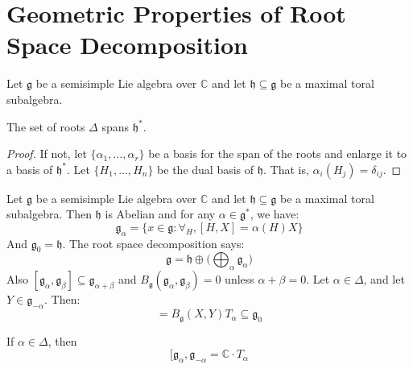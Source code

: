 \documentclass[crop=false,class=article]{standalone}                           %
\begin{document}
    \section{Geometric Properties of Root Space Decomposition}
        Let $\mathfrak{g}$ be a semisimple Lie algebra over $\mathbb{C}$ and let
        $\mathfrak{h}\subseteq\mathfrak{g}$ be a maximal toral subalgebra.
        \begin{theorem}
            The set of roots $\Delta$ spans $\mathfrak{h}^{*}$.
        \end{theorem}
        \begin{proof}
            If not, let $\{\alpha_{1},\dots,\alpha_{r}\}$ be a basis for the
            span of the roots and enlarge it to a basis of $\mathfrak{h}^{*}$.
            Let $\{H_{1},\dots,H_{n}\}$ be the dual basis of $\mathfrak{h}$.
            That is, $\alpha_{i}(H_{j})=\delta_{ij}$. 
        \end{proof}
        Let $\mathfrak{g}$ be a semisimple Lie algebra over $\mathbb{C}$ and let
        $\mathfrak{h}\subseteq\mathfrak{g}$ be a maximal toral subalgebra. Then
        $\mathfrak{h}$ is Abelian and for any $\alpha\in\mathfrak{g}^{*}$, we
        have:
        \begin{equation}
            \mathfrak{g}_{\alpha}=
            \{x\in\mathfrak{g}:\forall_{H},[H,X]=\alpha(H)X\}
        \end{equation}
        And $\mathfrak{g}_{0}=\mathfrak{h}$. The root space decomposition says:
        \begin{equation}
            \mathfrak{g}=
            \mathfrak{h}\oplus\Big(\bigoplus_{\alpha}\mathfrak{g}_{\alpha}\Big)
        \end{equation}
        Also $[\mathfrak{g}_{\alpha},\mathfrak{g}_{\beta}]%
              \subseteq\mathfrak{g}_{\alpha+\beta}$ and
        $B_{\mathfrak{g}}(\mathfrak{g}_{\alpha},\mathfrak{g}_{\beta})=0$ unless
        $\alpha+\beta=0$. Let $\alpha\in\Delta$, and let
        $Y\in\mathfrak{g}_{\minus\alpha}$. Then:
        \begin{equation}
            [X,Y]=B_{\mathfrak{g}}(X,Y)T_{\alpha}\subseteq\mathfrak{g}_{0}
        \end{equation}
        \begin{theorem}
            If $\alpha\in\Delta$, then
            \begin{equation}
                [\mathfrak{g}_{\alpha},\mathfrak{g}_{\minus\alpha}
                =\mathbb{C}\cdot{T}_{\alpha}
            \end{equation}
        \end{theorem}
\end{document}
